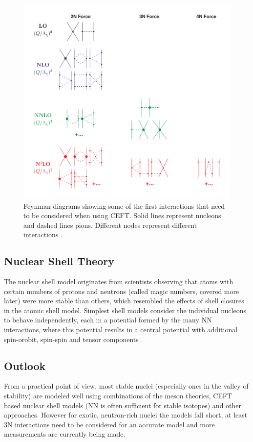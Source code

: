 \begin{figure}[H]
    \centering
    \includegraphics[width=.4\textwidth]{images/NFT_diagram.png}
    \caption{Feynman diagrams showing some of the first interactions that need to be considered when using CEFT. Solid lines represent nucleons and dashed lines pions. Different nodes represent different interactions \cite{machleidt_chiral_2011}.}\label{fig:diagram1}
\end{figure}

\subsection{Nuclear Shell Theory}
The nuclear shell model originates from scientists observing that atoms with certain numbers of protons and neutrons (called magic numbers, covered more later) were more stable than others, which resembled the effects of shell closures in the atomic shell model.
Simplest shell models consider the individual nucleons to behave independently, each in a potential formed by the many NN interactions, where this potential results in a central potential with additional spin-orobit, spin-spin and tensor components \cite{kruecken_introduction_2011}.


\subsection{Outlook}
From a practical point of view, most stable nuclei (especially ones in the valley of stability) are modeled well using combinations of the meson theories, CEFT based nuclear shell models (NN is often sufficient for stable isotopes) and other approaches.
However for exotic, neutron-rich nuclei the models fall short, at least 3N interactions need to be considered for an accurate model and more measurements are currently being made.

